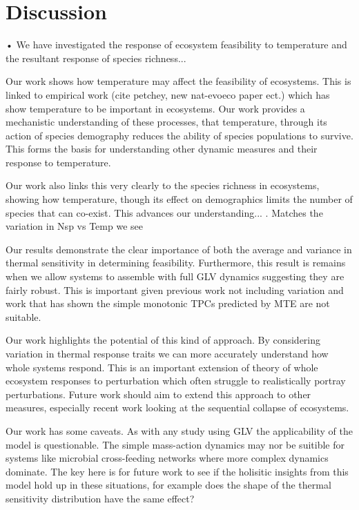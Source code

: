 \documentclass{article}
\begin{document}
\section{Discussion}

• We have investigated the response of ecosystem feasibility to temperature and the resultant response of species richness...

Our work shows how temperature may affect the feasibility of ecosystems. This is linked to empirical work (cite petchey, new nat-evoeco paper ect.) which has show temperature to be important in  ecosystems. Our work provides a mechanistic understanding of these processes, that temperature, through its action of species demography reduces the ability of species populations to survive. This forms the basis for understanding other dynamic measures and their response to temperature.  

Our work also links this very clearly to the species richness in ecosystems, showing how temperature, though its effect on demographics limits the number of species that can co-exist. This advances our understanding... . Matches the variation in Nsp vs Temp we see 

Our results demonstrate the clear importance of both the average and variance in thermal sensitivity in determining feasibility. Furthermore, this result is remains when we allow systems to assemble with full GLV dynamics suggesting they are fairly robust. This is important given previous work not including variation and work that has shown the simple monotonic TPCs predicted by MTE are not suitable.

Our work highlights the potential of this kind of approach. By considering variation in thermal response traits we can more accurately understand how whole systems respond. This is an important extension of theory of whole ecosystem responses to perturbation which often struggle to realistically portray perturbations. Future work should aim to extend this approach to other measures, especially recent work looking at the sequential collapse of ecosystems. 

Our work has some caveats. As with any study using GLV the applicability of the model is questionable. The simple mass-action dynamics may nor be suitible for systems like microbial cross-feeding networks where more complex dynamics dominate. The key here is for future work to see if the holisitic insights from this model hold up in these situations, for example does the shape of the thermal sensitivity distribution  have the same effect?
\end{document}
